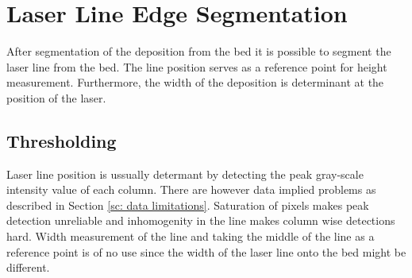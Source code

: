 \section{Laser Line Edge Segmentation} \label{sc: line segmentation}

After segmentation of the deposition from the bed it is possible to segment the laser line from the bed. The line position serves as a reference point for height measurement. Furthermore, the width of the deposition is  determinant at the position of the laser. 

\subsection*{Thresholding}
Laser line position is ussually determant by detecting the peak gray-scale intensity value of each column. There are however data implied problems as described in Section \ref{sc: data limitations}. Saturation of pixels makes peak detection unreliable and inhomogenity in the line makes column wise detections hard. Width measurement of the line and taking the middle of the line as a reference point is of no use since the width of the laser line onto the bed might be different. 

